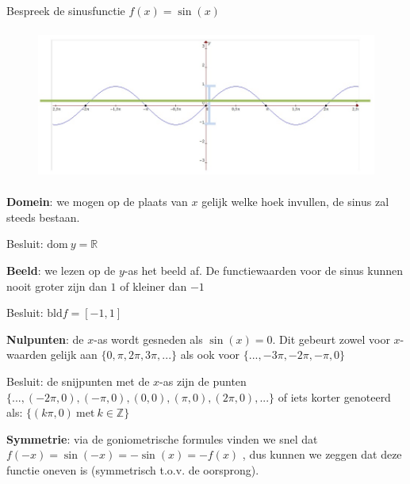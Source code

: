 \begin{voorbeeld}
	Bespreek de sinusfunctie $f(x)=\sin(x)$ 

\begin{figure}[h]
	\centering{}\includegraphics[height=5cm]{2_elem_rekenvaardigheden_B/inputs/reeel_vb3.jpg} 
\end{figure}


\textbf{Domein}: we mogen op de plaats van $x$ gelijk welke
hoek invullen, de sinus zal steeds bestaan.

Besluit: $\textrm{dom}\:y=\mathbb{R}$ 




\textbf{Beeld}: we lezen op de $y$-as het beeld af. De
functiewaarden voor de sinus kunnen nooit groter zijn dan $1$ of
kleiner dan $-1$

Besluit: $\textrm{bld}f=[-1,1]$




\textbf{Nulpunten}: de $x$-as wordt gesneden als $\sin(x)=0$.
Dit gebeurt zowel voor $x$-waarden gelijk aan $\{0,\pi,2\pi,3\pi,...\}$
als ook voor $\{...,-3\pi,-2\pi,-\pi,0\}$

Besluit: de snijpunten met de $x$-as zijn de punten $\{...,(-2\pi,0),(-\pi,0),(0,0),(\pi,0),(2\pi,0),...\}$
of iets korter genoteerd als: $\{(k\pi,0)\:\textrm{met}\:k\in\mathbb{Z}\}$




\textbf{Symmetrie}: via de goniometrische formules vinden
we snel dat $f(-x)=\sin(-x)=-\sin(x)=-f(x)$ , dus kunnen we zeggen
dat deze functie oneven is (symmetrisch t.o.v. de oorsprong).

\end{voorbeeld}